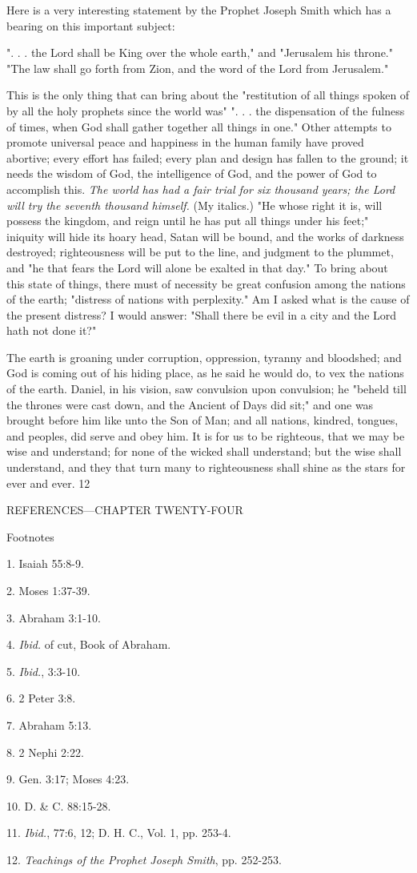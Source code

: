 Here is a very interesting statement by the Prophet Joseph Smith which has a bearing on this
important subject:

". . . the Lord shall be King over the whole earth," and "Jerusalem his throne." "The law shall
go forth from Zion, and the word of the Lord from Jerusalem."

This is the only thing that can bring about the "restitution of all things spoken of by all the
holy prophets since the world was" ". . . the dispensation of the fulness of times, when God
shall gather together all things in one." Other attempts to promote universal peace and
happiness in the human family have proved abortive; every effort has failed; every plan and
design has fallen to the ground; it needs the wisdom of God, the intelligence of God, and the
power of God to accomplish this. \textit{The world has had a fair trial for six thousand years; the
Lord will try the seventh thousand himself.} (My italics.) "He whose right it is, will possess
the kingdom, and reign until he has put all things under his feet;" iniquity will hide its hoary
head, Satan will be bound, and the works of darkness destroyed; righteousness will be put to
the line, and judgment to the plummet, and "he that fears the Lord will alone be exalted in
that day." To bring about this state of things, there must of necessity be great confusion
among the nations of the earth; "distress of nations with perplexity." Am I asked what is the
cause of the present distress? I would answer: "Shall there be evil in a city and the Lord hath
not done it?"

The earth is groaning under corruption, oppression, tyranny and bloodshed; and God is
coming out of his hiding place, as he said he would do, to vex the nations of the earth.
Daniel, in his vision, saw convulsion upon convulsion; he "beheld till the thrones were cast
down, and the Ancient of Days did sit;" and one was brought before him like unto the Son of
Man; and all nations, kindred, tongues, and peoples, did serve and obey him. It is for us to be
righteous, that we may be wise and understand; for none of the wicked shall understand; but
the wise shall understand, and they that turn many to righteousness shall shine as the stars for
ever and ever. 12

\newpage
REFERENCES—CHAPTER TWENTY-FOUR

Footnotes

1. Isaiah 55:8-9.

2. Moses 1:37-39.

3. Abraham 3:1-10.

4. \textit{Ibid.} of cut, Book of Abraham.

5. \textit{Ibid.}, 3:3-10.

6. 2 Peter 3:8.

7. Abraham 5:13.

8. 2 Nephi 2:22.

9. Gen. 3:17; Moses 4:23.

10. D. \& C. 88:15-28.

11. \textit{Ibid.}, 77:6, 12; D. H. C., Vol. 1, pp. 253-4.

12. \textit{Teachings of the Prophet Joseph Smith}, pp. 252-253.

